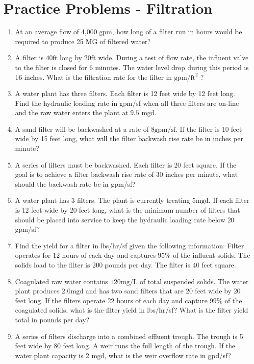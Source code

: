 \section*{Practice Problems - Filtration}
\begin{enumerate}
	\item At an average flow of 4,000 gpm, how long of a filter run in hours would be required to produce 25 MG of filtered water?
	
	\item A filter is $40 \mathrm{ft}$ long by $20 \mathrm{ft}$ wide. During a test of flow rate, the influent valve to the filter is closed for 6 minutes. The water level drop during this period is 16 inches. What is the filtration rate for the filter in $\mathrm{gpm} / \mathrm{ft}^{2}$ ?\\

  \item A water plant has three filters. Each filter is 12 feet wide by 12 feet long. Find the hydraulic loading rate in gpm/sf when all three filters are on-line and the raw water enters the plant at $9.5$ mgd.

  \item A sand filter will be backwashed at a rate of $8 \mathrm{gpm} / \mathrm{sf}$. If the filter is 10 feet wide by 15 feet long, what will the filter backwash rise rate be in inches per minute?

  \item A series of filters must be backwashed. Each filter is 20 feet square. If the goal is to achieve a filter backwash rise rate of 30 inches per minute, what should the backwash rate be in gpm/sf?

  \item A water plant has 3 filters. The plant is currently treating $5 \mathrm{mgd}$. If each filter is 12 feet wide by 20 feet long, what is the minimum number of filters that should be placed into service to keep the hydraulic loading rate below 20 gpm/sf?

  \item Find the yield for a filter in lbs/hr/sf given the following information: Filter operates for 12 hours of each day and captures $95 \%$ of the influent solids. The solids load to the filter is 200 pounds per day. The filter is 40 feet square.

  \item Coagulated raw water contains $120 \mathrm{mg} / \mathrm{L}$ of total suspended solids. The water plant produces $2.0 \mathrm{mgd}$ and has two sand filters that are 20 feet wide by 20 feet long. If the filters operate 22 hours of each day and capture $99 \%$ of the coagulated solids, what is the filter yield in lbs/hr/sf? What is the filter yield total in pounds per day?

  \item A series of filters discharge into a combined effluent trough. The trough is 5 feet wide by 80 feet long. A weir runs the full length of the trough. If the water plant capacity is 2 mgd, what is the weir overflow rate in gpd/sf?

\end{enumerate}

